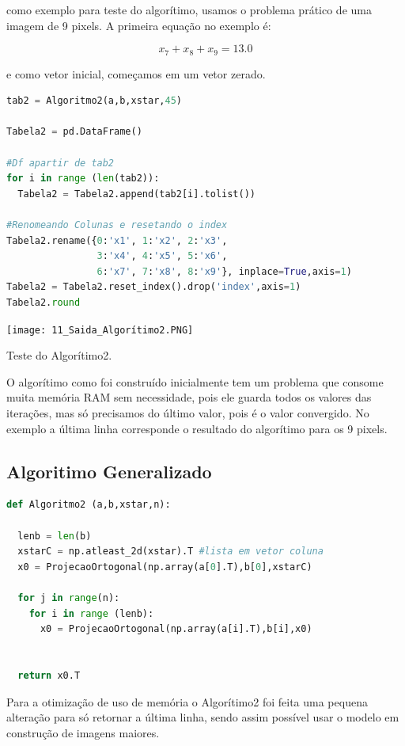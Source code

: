 \documentclass[a4paper, 12pt]{article}
\begin{document}
como exemplo para teste do algorítimo, usamos o problema prático de uma imagem de 9 pixels. A primeira equação no exemplo é:

$$x_7+x_8+x_9=13.0$$

e como vetor inicial, começamos em um vetor zerado.

\begin{lstlisting}[language=Python, caption=Calculo e Saída, label=Algoritimo2_saida]
tab2 = Algoritmo2(a,b,xstar,45)

Tabela2 = pd.DataFrame()

#Df apartir de tab2
for i in range (len(tab2)):
  Tabela2 = Tabela2.append(tab2[i].tolist())

#Renomeando Colunas e resetando o index
Tabela2.rename({0:'x1', 1:'x2', 2:'x3', 
                3:'x4', 4:'x5', 5:'x6',
                6:'x7', 7:'x8', 8:'x9'}, inplace=True,axis=1)
Tabela2 = Tabela2.reset_index().drop('index',axis=1)
Tabela2.round
\end{lstlisting}

\begin{center}
    \texttt{[image: 11\_Saida\_Algorítimo2.PNG]}
    
    Teste do Algorítimo2.
\end{center}

O algorítimo como foi construído inicialmente tem um problema que consome muita memória RAM sem necessidade, pois ele guarda todos os valores das iterações, mas só precisamos do último valor, pois é o valor convergido. No exemplo a última linha corresponde o resultado do algorítimo para os 9 pixels.

\subsection{Algoritimo Generalizado}

\begin{lstlisting}[language=Python, caption=Algorítimo Generalizado, label=AlgoritimoGeneralizado]
def Algoritmo2 (a,b,xstar,n):
  
  lenb = len(b)
  xstarC = np.atleast_2d(xstar).T #lista em vetor coluna
  x0 = ProjecaoOrtogonal(np.array(a[0].T),b[0],xstarC)

  for j in range(n):
    for i in range (lenb):
      x0 = ProjecaoOrtogonal(np.array(a[i].T),b[i],x0)
   
  
  return x0.T
\end{lstlisting}

Para a otimização de uso de memória o Algorítimo2 foi feita uma pequena alteração para só retornar a última linha, sendo assim possível usar o modelo em construção de imagens maiores.
\end{document}
